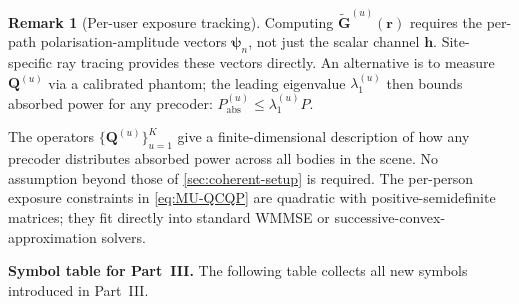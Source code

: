 \documentclass[11pt,a4paper]{article}
\theoremstyle{definition}      %
\newtheorem{remark}[remark]{Remark}
\begin{document}
\begin{remark}[Per-user exposure tracking]
Computing $\tilde{\mathbf{G}}^{(u)}(\mathbf{r})$ requires the
per-path polarisation-amplitude vectors $\boldsymbol{\psi}_n$, not
just the scalar channel $\mathbf{h}$.  Site-specific ray tracing
provides these vectors directly.  An alternative is to measure
$\mathbf{Q}^{(u)}$ via a calibrated phantom; the leading eigenvalue
$\lambda_1^{(u)}$ then bounds absorbed power for any precoder:
$P_\mathrm{abs}^{(u)} \leq \lambda_1^{(u)} P$.
\end{remark}

The operators $\{\mathbf{Q}^{(u)}\}_{u=1}^K$ give a finite-dimensional
description of how any precoder distributes absorbed power across all
bodies in the scene.  No assumption beyond those of
\cref{sec:coherent-setup} is required.  The per-person exposure
constraints in \cref{eq:MU-QCQP} are quadratic with
positive-semidefinite matrices; they fit directly into standard WMMSE
or successive-convex-approximation solvers.

\bigskip
\noindent\textbf{Symbol table for Part~III.}
The following table collects all new symbols introduced in Part~III.
\end{document}
